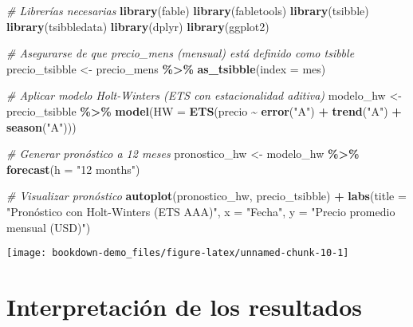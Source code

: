 \documentclass[
  11pt,
]{book}
\newenvironment{Shaded}{\begin{snugshade}}{\end{snugshade}}
\newcommand{\AttributeTok}[1]{\textcolor[rgb]{0.13,0.29,0.53}{#1}}
\newcommand{\CommentTok}[1]{\textcolor[rgb]{0.56,0.35,0.01}{\textit{#1}}}
\newcommand{\FunctionTok}[1]{\textcolor[rgb]{0.13,0.29,0.53}{\textbf{#1}}}
\newcommand{\NormalTok}[1]{#1}
\newcommand{\OtherTok}[1]{\textcolor[rgb]{0.56,0.35,0.01}{#1}}
\newcommand{\SpecialCharTok}[1]{\textcolor[rgb]{0.81,0.36,0.00}{\textbf{#1}}}
\newcommand{\StringTok}[1]{\textcolor[rgb]{0.31,0.60,0.02}{#1}}
\begin{document}
\begin{Shaded}
\begin{Highlighting}[]
\CommentTok{\# Librerías necesarias}
\FunctionTok{library}\NormalTok{(fable)}
\FunctionTok{library}\NormalTok{(fabletools)}
\FunctionTok{library}\NormalTok{(tsibble)}
\FunctionTok{library}\NormalTok{(tsibbledata)}
\FunctionTok{library}\NormalTok{(dplyr)}
\FunctionTok{library}\NormalTok{(ggplot2)}

\CommentTok{\# Asegurarse de que precio\_mens (mensual) está definido como tsibble}
\NormalTok{precio\_tsibble }\OtherTok{\textless{}{-}}\NormalTok{ precio\_mens }\SpecialCharTok{\%\textgreater{}\%}
  \FunctionTok{as\_tsibble}\NormalTok{(}\AttributeTok{index =}\NormalTok{ mes)}

\CommentTok{\# Aplicar modelo Holt{-}Winters (ETS con estacionalidad aditiva)}
\NormalTok{modelo\_hw }\OtherTok{\textless{}{-}}\NormalTok{ precio\_tsibble }\SpecialCharTok{\%\textgreater{}\%}
  \FunctionTok{model}\NormalTok{(}\AttributeTok{HW =} \FunctionTok{ETS}\NormalTok{(precio }\SpecialCharTok{\textasciitilde{}} \FunctionTok{error}\NormalTok{(}\StringTok{"A"}\NormalTok{) }\SpecialCharTok{+} \FunctionTok{trend}\NormalTok{(}\StringTok{"A"}\NormalTok{) }\SpecialCharTok{+} \FunctionTok{season}\NormalTok{(}\StringTok{"A"}\NormalTok{)))}

\CommentTok{\# Generar pronóstico a 12 meses}
\NormalTok{pronostico\_hw }\OtherTok{\textless{}{-}}\NormalTok{ modelo\_hw }\SpecialCharTok{\%\textgreater{}\%}
  \FunctionTok{forecast}\NormalTok{(}\AttributeTok{h =} \StringTok{"12 months"}\NormalTok{)}

\CommentTok{\# Visualizar pronóstico}
\FunctionTok{autoplot}\NormalTok{(pronostico\_hw, precio\_tsibble) }\SpecialCharTok{+}
  \FunctionTok{labs}\NormalTok{(}\AttributeTok{title =} \StringTok{"Pronóstico con Holt{-}Winters (ETS AAA)"}\NormalTok{,}
       \AttributeTok{x =} \StringTok{"Fecha"}\NormalTok{, }\AttributeTok{y =} \StringTok{"Precio promedio mensual (USD)"}\NormalTok{)}
\end{Highlighting}
\end{Shaded}

\begin{center}\texttt{[image: bookdown-demo\_files/figure-latex/unnamed-chunk-10-1]} \end{center}

\section{Interpretación de los resultados}\label{interpretaciuxf3n-de-los-resultados}
\end{document}
